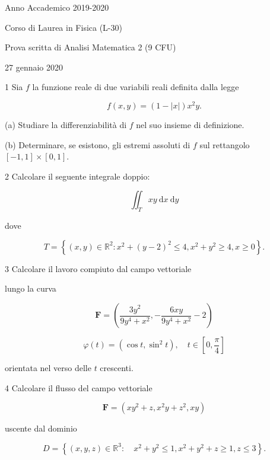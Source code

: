 \documentclass[10pt]{article}
\begin{document}
Anno Accademico 2019-2020

Corso di Laurea in Fisica (L-30)

Prova scritta di Analisi Matematica 2 (9 CFU)

27 gennaio 2020

1 Sia \(f\) la funzione reale di due variabili reali definita dalla legge

\[
f(x, y)=(1-|x|) x^{2} y .
\]

(a) Studiare la differenziabilità di \(f\) nel suo insieme di definizione.

(b) Determinare, se esistono, gli estremi assoluti di \(f\) sul rettangolo \([-1,1] \times[0,1]\).

2 Calcolare il seguente integrale doppio:

\[
\iint_{T} x y \mathrm{~d} x \mathrm{~d} y
\]

dove

\[
T=\left\{(x, y) \in \mathbb{R}^{2}: x^{2}+(y-2)^{2} \leq 4, x^{2}+y^{2} \geq 4, x \geq 0\right\} .
\]

3 Calcolare il lavoro compiuto dal campo vettoriale

lungo la curva

\[
\mathbf{F}=\left(\frac{3 y^{2}}{9 y^{4}+x^{2}},-\frac{6 x y}{9 y^{4}+x^{2}}-2\right)
\]

\[
\varphi(t)=\left(\cos t, \sin ^{2} t\right), \quad t \in\left[0, \frac{\pi}{4}\right]
\]

orientata nel verso delle \(t\) crescenti.

4 Calcolare il flusso del campo vettoriale

\[
\mathbf{F}=\left(x y^{2}+z, x^{2} y+z^{2}, x y\right)
\]

uscente dal dominio

\[
D=\left\{(x, y, z) \in \mathbb{R}^{3}: \quad x^{2}+y^{2} \leq 1, x^{2}+y^{2}+z \geq 1, z \leq 3\right\} .
\]
\end{document}
